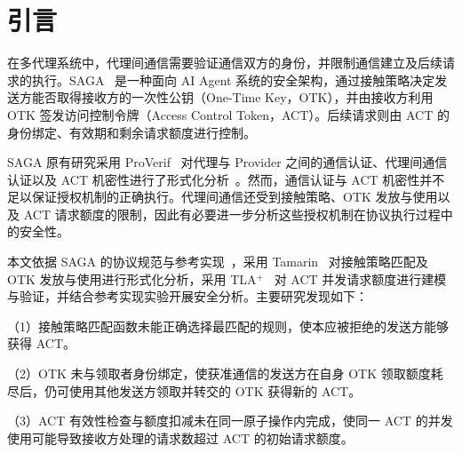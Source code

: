 
\section{引言}
\label{sec:introduction}

在多代理系统中，代理间通信需要验证通信双方的身份，并限制通信建立及后续请求的执行。SAGA~\cite{syros2025saga} 是一种面向 AI Agent 系统的安全架构，通过接触策略决定发送方能否取得接收方的一次性公钥（One-Time Key，OTK），并由接收方利用 OTK 签发访问控制令牌（Access Control Token，ACT）。后续请求则由 ACT 的身份绑定、有效期和剩余请求额度进行控制。

SAGA 原有研究采用 ProVerif~\cite{blanchet2016proverif} 对代理与 Provider 之间的通信认证、代理间通信认证以及 ACT 机密性进行了形式化分析~\cite{syros2025saga}。然而，通信认证与 ACT 机密性并不足以保证授权机制的正确执行。代理间通信还受到接触策略、OTK 发放与使用以及 ACT 请求额度的限制，因此有必要进一步分析这些授权机制在协议执行过程中的安全性。

本文依据 SAGA 的协议规范与参考实现~\cite{syros2025sagaV2,sagaReferenceImpl2026}，采用 Tamarin~\cite{meier2013tamarin} 对接触策略匹配及 OTK 发放与使用进行形式化分析，采用 TLA$^{+}$~\cite{lamport2002specifying} 对 ACT 并发请求额度进行建模与验证，并结合参考实现实验开展安全分析。主要研究发现如下：

（1）接触策略匹配函数未能正确选择最匹配的规则，使本应被拒绝的发送方能够获得 ACT。

（2）OTK 未与领取者身份绑定，使获准通信的发送方在自身 OTK 领取额度耗尽后，仍可使用其他发送方领取并转交的 OTK 获得新的 ACT。

（3）ACT 有效性检查与额度扣减未在同一原子操作内完成，使同一 ACT 的并发使用可能导致接收方处理的请求数超过 ACT 的初始请求额度。

